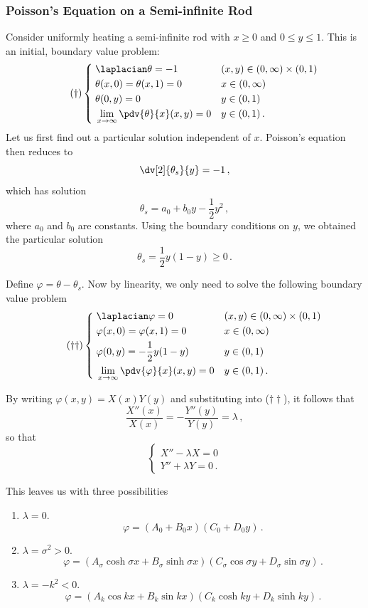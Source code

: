 \documentclass{article}
\theoremstyle{plain}\theoremheaderfont{\normalfont\itshape}\theorembodyfont{\rmfamily}\theoremseparator{.}\newtheorem*{rem}{Remark}\newtheorem*{ex}{Example}\newtheorem*{proof}{Proof}\newtheorem*{altp}{Alternative proof}
\theoremstyle{plain}\theoremheaderfont{\normalfont\bfseries}\theorembodyfont{\rmfamily}\theoremseparator{.}\newtheorem{thm}{Theorem}[section]\newtheorem{lem}[thm]{Lemma}\newtheorem{prop}[thm]{Proposition}\newtheorem*{cor}{Corollary}\newtheorem{defn}[thm]{Definition}\newtheorem{clm}[thm]{Claim}\newtheorem{clminproof}{Claim}
\theoremstyle{break}\theoremheaderfont{\normalfont\itshape}\theorembodyfont{\rmfamily}\theoremseparator{.\medskip}\newtheorem*{proofskip}{Proof}\newtheorem*{exs}{Examples}\newtheorem*{rems}{Remarks}
\theoremstyle{break}\theoremheaderfont{\normalfont\bfseries}\theorembodyfont{\rmfamily}\theoremseparator{.\medskip}\newtheorem{lemskip}[thm]{Lemma}\newtheorem{defnskip}[thm]{Definition}\newtheorem{propskip}[thm]{Proposition}\newtheorem{thmskip}[thm]{Theorem}
\numberwithin{equation}{section}
\begin{document}
	\subsubsection{Poisson's Equation on a Semi-infinite Rod}
	Consider uniformly heating a semi-infinite rod with \(x\ge 0\) and \(0\le y\le 1\). This is an initial, boundary value problem:
	\begin{equation}\tag{\(\dagger\)}
		\left\{\begin{aligned}
			& \;\laplacian\theta=-1 && (x,y)\in(0,\infty)\times(0,1)\\
			& \;\theta(x,0)=\theta(x,1)=0 && x\in(0,\infty)\\
			& \;\theta(0,y)=0 && y\in(0,1)\\
			& \;\lim_{x\to\infty}\pdv{\theta}{x}(x,y)=0 && y\in(0,1)\,.
		\end{aligned}\right.
	\end{equation}
	Let us first find out a particular solution independent of \(x\). Poisson's equation then reduces to
	\[\dv[2]{\theta_s}{y}=-1\,,\]
	which has solution
	\[\theta_s=a_0+b_0y-\frac{1}{2}y^2\,,\]
	where \(a_0\) and \(b_0\) are constants. Using the boundary conditions on \(y\), we obtained the particular solution
	\[\theta_s=\frac{1}{2}y(1-y)\ge 0\,.\]

	Define \(\varphi=\theta-\theta_s\). Now by linearity, we only need to solve the following boundary value problem
	\begin{equation}\tag{\(\dagger\dagger\)}
		\left\{\begin{aligned}
			& \;\laplacian\varphi=0 && (x,y)\in(0,\infty)\times(0,1)\\
			& \;\varphi(x,0)=\varphi(x,1)=0 && x\in(0,\infty)\\
			& \;\varphi(0,y)=-\frac{1}{2}y(1-y) && y\in(0,1)\\
			& \;\lim_{x\to\infty}\pdv{\varphi}{x}(x,y)=0 && y\in(0,1)\,.
		\end{aligned}\right.
	\end{equation}

	By writing \(\varphi(x,y)=X(x)Y(y)\) and substituting into (\(\dagger\dagger\)), it follows that
	\[\frac{X''(x)}{X(x)}=-\frac{Y''(y)}{Y(y)}=\lambda\,,\]
	so that
	\[\begin{cases}
		X''-\lambda X=0\\
		Y''+\lambda Y=0\,.
	\end{cases}\]
	
	This leaves us with three possibilities
	\begin{enumerate}[topsep=0pt]
		\item \(\lambda=0\).
		\[\varphi=(A_0+B_0 x)(C_0+D_0 y)\,.\]
		\item \(\lambda=\sigma^2>0\).
		\[\varphi=(A_\sigma\cosh\sigma x+B_\sigma\sinh\sigma x)(C_\sigma\cos\sigma y+D_\sigma\sin\sigma y)\,.\]
		\item \(\lambda=-k^2<0\).
		\[\varphi=(A_k\cos kx+B_k\sin kx)(C_k\cosh ky+D_k\sinh ky)\,.\]
	\end{enumerate}
	
\end{document}

